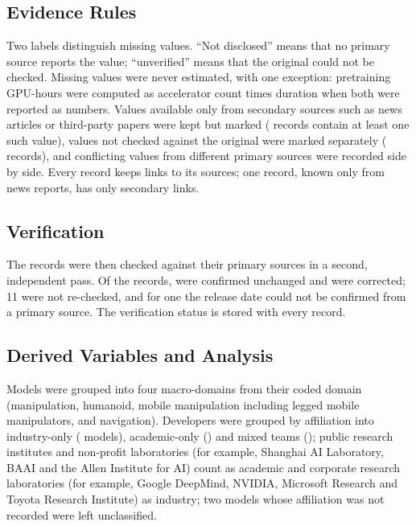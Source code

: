 \documentclass[applsci,review,submit,pdftex,oneauthor]{Definitions/mdpi}
\begin{document}
\subsection{Evidence Rules}

Two labels distinguish missing values. ``Not disclosed'' means that no primary source reports the value; ``unverified'' means that the original could not be checked. Missing values were never estimated, with one exception: pretraining GPU-hours were computed as accelerator count times duration when both were reported as numbers. Values available only from secondary sources such as news articles or third-party papers were kept but marked (\nSecondary{} records contain at least one such value), values not checked against the original were marked separately (\nDagger{} records), and conflicting values from different primary sources were recorded side by side. Every record keeps links to its sources; one record, known only from news reports, has only secondary links.

\subsection{Verification}

The records were then checked against their primary sources in a second, independent pass. Of the \nModels{} records, \nVerified{} were confirmed unchanged and \nCorrected{} were corrected; 11 were not re-checked, and for one the release date could not be confirmed from a primary source. The verification status is stored with every record.

\subsection{Derived Variables and Analysis}

Models were grouped into four macro-domains from their coded domain (manipulation, humanoid, mobile manipulation including legged mobile manipulators, and navigation). Developers were grouped by affiliation into industry-only (\nInd{} models), academic-only (\nAcad{}) and mixed teams (\nMixed{}); public research institutes and non-profit laboratories (for example, Shanghai AI Laboratory, BAAI and the Allen Institute for AI) count as academic and corporate research laboratories (for example, Google DeepMind, NVIDIA, Microsoft Research and Toyota Research Institute) as industry; two models whose affiliation was not recorded were left unclassified.
\end{document}
